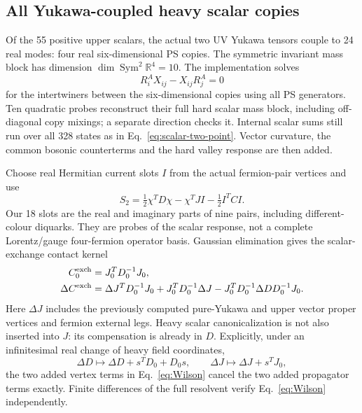 \documentclass[11pt]{article}
\begin{document}
\subsection{All Yukawa-coupled heavy scalar copies}
Of the 55 positive upper scalars, the actual two UV Yukawa tensors
couple to 24 real modes: four real six-dimensional PS copies. The
symmetric invariant mass block has dimension
$\dim\operatorname{Sym}^2\mathbb R^4=10$. The implementation solves
\begin{equation}
 R_i^A X_{ij}-X_{ij}R_j^A=0
\end{equation}
for the intertwiners between the six-dimensional copies using all PS
generators. Ten quadratic probes reconstruct their full hard scalar
mass block, including off-diagonal copy mixings; a separate direction
checks it. Internal scalar sums still run over all 328 states as in
Eq.~\eqref{eq:scalar-two-point}. Vector curvature, the common bosonic
counterterms and the hard valley response are then added.

Choose real Hermitian current slots $I$ from the actual fermion-pair
vertices and use
\begin{equation}
 S_2=\tfrac12\chi^TD\chi-\chi^TJI-\tfrac12 I^TCI.
\end{equation}
Our 18 slots are the real and imaginary parts of nine pairs, including
different-colour diquarks. They are probes of the scalar response, not
a complete Lorentz/gauge four-fermion operator basis. Gaussian
elimination gives the scalar-exchange contact kernel
\begin{align}
 C_0^{\rm exch}&=J_0^TD_0^{-1}J_0,\\
 \Delta C^{\rm exch}&=\Delta J^TD_0^{-1}J_0
   +J_0^TD_0^{-1}\Delta J
   -J_0^TD_0^{-1}\Delta D D_0^{-1}J_0.
 \label{eq:Wilson}
\end{align}
Here $\Delta J$ includes the previously computed pure-Yukawa and upper
vector proper vertices and fermion external legs. Heavy scalar
canonicalization is not also inserted into $J$: its compensation is
already in $D$. Explicitly, under an infinitesimal real change of heavy
field coordinates,
\begin{equation}
 \Delta D\mapsto\Delta D+s^TD_0+D_0s,\qquad
 \Delta J\mapsto\Delta J+s^TJ_0,
\end{equation}
the two added vertex terms in Eq.~\eqref{eq:Wilson} cancel the two added
propagator terms exactly. Finite differences of the full resolvent
verify Eq.~\eqref{eq:Wilson} independently.
\end{document}
